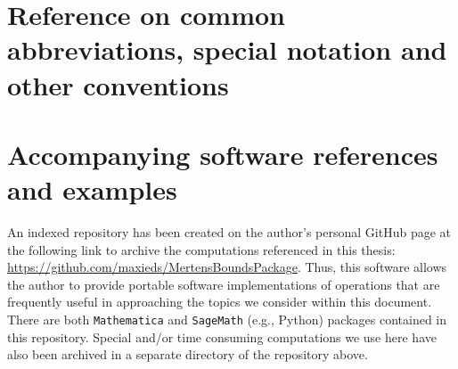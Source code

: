 \documentclass[11pt,reqno,a4letter]{article}
\numberwithin{figure}{section}
\numberwithin{table}{section}
\theoremstyle{plain}
\numberwithin{theorem}{section}
\theoremstyle{definition}
\begin{document}
\newpage
\setcounter{section}{0}
\renewcommand{\thesection}{Appendix \Alph{section}}
\renewcommand{\thesubsection}{\Alph{section}.\arabic{subsection}}

\newpage
\section{Reference on common abbreviations, special notation and other conventions} 
\label{Appendix_Glossary_NotationConvs}

     \vskip -0.35in
     \printglossary[type={symbols},title={},style={glossstyleSymbol},nogroupskip=true]

\newpage
\section{Accompanying software references and examples} 
\label{Appendix_SoftwarePackages} 

An indexed repository has been created on the 
author's personal GitHub page at the following link to archive the 
computations referenced in this thesis: 
\href{https://github.com/maxieds/MertensBoundsPackage}{\url{https://github.com/maxieds/MertensBoundsPackage}}. 
Thus, this software allows the author to provide portable software implementations 
of operations that are frequently useful in approaching the topics we consider within this 
document. There are both \texttt{Mathematica} and \texttt{SageMath} (e.g., Python) packages 
contained in this repository. Special and/or time consuming computations we use here have also 
been archived in a separate directory of the repository above. 
\end{document}
